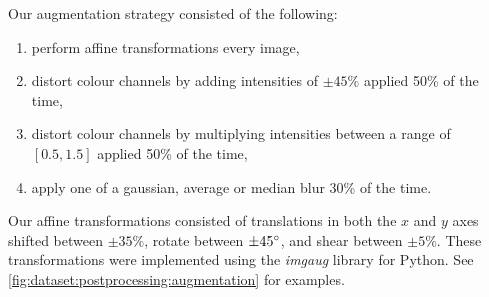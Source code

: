 \begin{table}[t]
\centering
\caption[Breakdown of training and validation data]{Breakdown of images and annotations (runners) used for training and validation.}
\label{tab:dataset:postprocessing:augmentation_quantities}
\end{table}

Our augmentation strategy consisted of the following:

\begin{enumerate}
  \item perform affine transformations every image,
  \item distort colour channels by adding intensities of $\pm45\%$ applied 50\% of the time,
  \item distort colour channels by multiplying intensities between a range of $[0.5, 1.5]$ applied 50\% of the time,
  \item apply one of a gaussian, average or median blur 30\% of the time.
\end{enumerate}

Our affine transformations consisted of translations in both the $x$ and $y$ axes shifted between $\pm35\%$, rotate between $\pm45\degree$, and shear between $\pm5\%$. These transformations were implemented using the \textit{imgaug} library for Python. See \cref{fig:dataset:postprocessing:augmentation} for examples.

